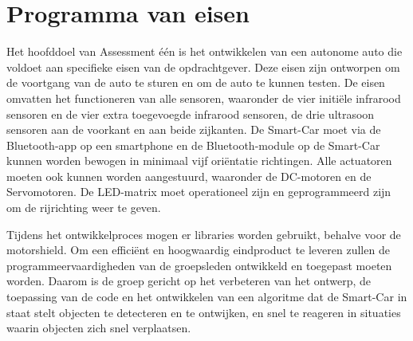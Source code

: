 \section{Programma van eisen}

Het hoofddoel van Assessment één is het ontwikkelen van een autonome auto die voldoet aan specifieke eisen van de opdrachtgever. Deze eisen zijn ontworpen om de voortgang van de auto te sturen en om de auto te kunnen testen. De eisen omvatten het functioneren van alle sensoren, waaronder de vier initiële infrarood sensoren en de vier extra toegevoegde infrarood sensoren, de drie ultrasoon sensoren aan de voorkant en aan beide zijkanten. De \gls{Smart-Car} moet via de \gls{Bluetooth}-app op een smartphone en de \gls{Bluetooth}-module op de \gls{Smart-Car} kunnen worden bewogen in minimaal vijf oriëntatie richtingen. Alle actuatoren moeten ook kunnen worden aangestuurd, waaronder de DC-motoren en de Servomotoren. De LED-matrix moet operationeel zijn en geprogrammeerd zijn om de rijrichting weer te geven.

Tijdens het ontwikkelproces mogen er libraries worden gebruikt, behalve voor de motorshield. Om een efficiënt en hoogwaardig eindproduct te leveren zullen de programmeervaardigheden van de groepsleden ontwikkeld en toegepast moeten worden. Daarom is de groep gericht op het verbeteren van het ontwerp, de toepassing van de code en het ontwikkelen van een algoritme dat de \gls{Smart-Car} in staat stelt objecten te detecteren en te ontwijken, en snel te reageren in situaties waarin objecten zich snel verplaatsen.

